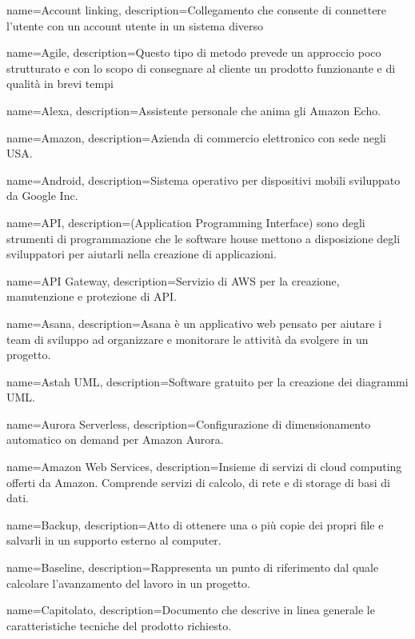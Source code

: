{
name={Account linking},
description={Collegamento che consente di connettere l’utente con un account utente in
un sistema diverso}
}

{
name={Agile},
description={Questo tipo di metodo prevede un approccio poco strutturato e con lo scopo di consegnare al cliente un prodotto funzionante e di qualità in brevi tempi}
}

{
name={Alexa},
description={Assistente personale che anima gli Amazon Echo.}
}

{
name={Amazon},
description={Azienda di commercio elettronico con sede negli USA.}
}

{
name={Android},
description={Sistema operativo per dispositivi mobili sviluppato da Google Inc.}
}

{
name={API},
description={(Application Programming Interface) sono degli strumenti di programmazione che le software house mettono a disposizione degli sviluppatori per aiutarli
nella creazione di applicazioni.}
}

{
name={API Gateway},
description={Servizio di AWS per la creazione, manutenzione e protezione di API.}
}

{
name={Asana},
description={Asana è un applicativo web pensato per aiutare i team di sviluppo ad organizzare e monitorare le attività da svolgere in un progetto.}
}

{
name={Astah UML},
description={Software gratuito per la creazione dei diagrammi UML.}
}

{
name={Aurora Serverless},
description={Configurazione di dimensionamento automatico on demand per Amazon Aurora.}
}

{
name={Amazon Web Services},
description={Insieme di servizi di cloud computing offerti da Amazon. Comprende servizi di calcolo, di rete e di storage di basi di dati.}
}

{
name={Backup},
description={Atto di ottenere una o più copie dei propri file e salvarli in un supporto esterno al computer.}
}

{
name={Baseline},
description={Rappresenta un punto di riferimento dal quale calcolare l’avanzamento del lavoro in un progetto.}
}

{
name={Capitolato},
description={Documento che descrive in linea generale le caratteristiche tecniche del prodotto richiesto.}
}

